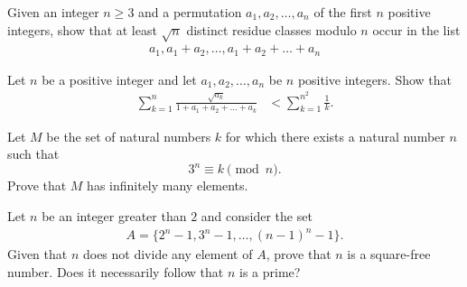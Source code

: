 \documentclass[problems.tex]{subfile}
\begin{document}
	\begin{problem}
		Given an integer $n \geq 3$ and a permutation $a_1, a_2, \dots, a_n$ of the first $n$ positive integers, show that at least $\sqrt n$ distinct residue classes modulo $n$ occur in the list
		\begin{align*}
			a_1, a_1 + a_2, \dots, a_1 + a_2 + \dots + a_n
		\end{align*}
	\end{problem}


	\begin{problem}
		Let $n$ be a positive integer and let $a_1, a_2, \dots, a_n$ be $n$ positive integers. Show that
		\begin{align*}
			\sum_{k=1}^{n} \frac{\sqrt{a_k}}{1+a_1+a_2+\dots +a_k} &< \sum_{k=1}^{n^2} \frac{1}{k}.
		\end{align*}
	\end{problem}

	\begin{problem}
		Let $M$ be the set of natural numbers $k$ for which there exists a natural number $n$ such that
		$$3^n \equiv k\pmod n.$$ Prove that $M$ has infinitely many elements. %
	\end{problem}

	\begin{problem}
		Let $n$ be an integer greater than $2$ and consider the set
		\begin{align*}
			A = \{2^n-1,3^n-1,\dots,(n-1)^n-1\}.
		\end{align*}
		Given that $n$ does not divide any element of $A$, prove that $n$ is a square-free number. Does it necessarily follow that $n$ is a prime? %
	\end{problem}
\end{document}
